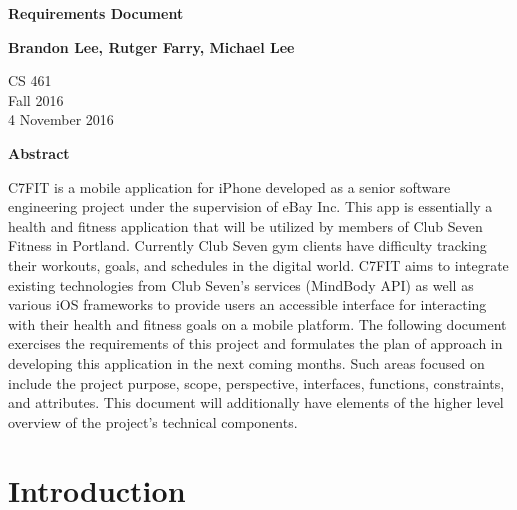 \documentclass[letterpaper,10pt,titlepage]{article}
\begin{document}
\begin{titlepage}
    \begin{center}
        \vspace*{3.5cm}

        \textbf{Requirements Document}

        \vspace{0.5cm}

        \textbf{Brandon Lee, Rutger Farry, Michael Lee}

        \vspace{0.8cm}

        CS 461\\
        Fall 2016\\
        4 November 2016\\

        \vspace{1cm}

        \textbf{Abstract}\\

        \vspace{0.5cm}

        C7FIT is a mobile application for iPhone developed as a senior software engineering project under the supervision of eBay Inc. This app is essentially a health and fitness application that will be utilized by members of Club Seven Fitness in Portland. Currently Club Seven gym clients have difficulty tracking their workouts, goals, and schedules in the digital world. C7FIT aims to integrate existing technologies from Club Seven’s services (MindBody API) as well as various iOS frameworks to provide users an accessible interface for interacting with their health and fitness goals on a mobile platform. The following document exercises the requirements of this project and formulates the plan of approach in developing this application in the next coming months. Such areas focused on include the project purpose, scope, perspective, interfaces, functions, constraints, and attributes. This document will additionally have elements of the higher level overview of the project’s technical components.

        \vfill

    \end{center}
\end{titlepage}

\newpage

\tableofcontents

\newpage

\section{Introduction}
\end{document}
